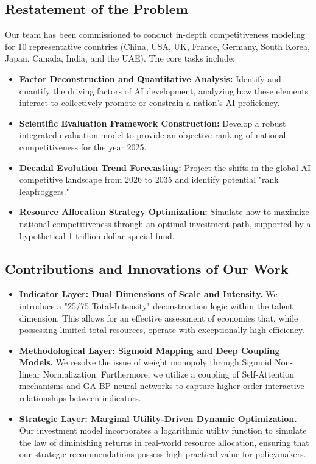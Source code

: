 \documentclass[12pt]{article}
\begin{document}
	\subsection{Restatement of the Problem}
	Our team has been commissioned to conduct in-depth competitiveness modeling for 10 representative countries (China, USA, UK, France, Germany, South Korea, Japan, Canada, India, and the UAE). The core tasks include:
	\begin{itemize}
		\item \textbf{Factor Deconstruction and Quantitative Analysis:} Identify and quantify the driving factors of AI development, analyzing how these elements interact to collectively promote or constrain a nation's AI proficiency.
		\item \textbf{Scientific Evaluation Framework Construction:} Develop a robust integrated evaluation model to provide an objective ranking of national competitiveness for the year 2025.
		\item \textbf{Decadal Evolution Trend Forecasting:} Project the shifts in the global AI competitive landscape from 2026 to 2035 and identify potential "rank leapfroggers."
		\item \textbf{Resource Allocation Strategy Optimization:} Simulate how to maximize national competitiveness through an optimal investment path, supported by a hypothetical 1-trillion-dollar special fund.
	\end{itemize}
	
	\subsection{Contributions and Innovations of Our Work}
	\begin{itemize}
		\item \textbf{Indicator Layer: Dual Dimensions of Scale and Intensity.} We introduce a "25/75 Total-Intensity" deconstruction logic within the talent dimension. This allows for an effective assessment of economies that, while possessing limited total resources, operate with exceptionally high efficiency.
		\item \textbf{Methodological Layer: Sigmoid Mapping and Deep Coupling Models.} We resolve the issue of weight monopoly through Sigmoid Non-linear Normalization. Furthermore, we utilize a coupling of Self-Attention mechanisms and GA-BP neural networks to capture higher-order interactive relationships between indicators.
		\item \textbf{Strategic Layer: Marginal Utility-Driven Dynamic Optimization.} Our investment model incorporates a logarithmic utility function to simulate the law of diminishing returns in real-world resource allocation, ensuring that our strategic recommendations possess high practical value for policymakers.
	\end{itemize}
	
\end{document}

